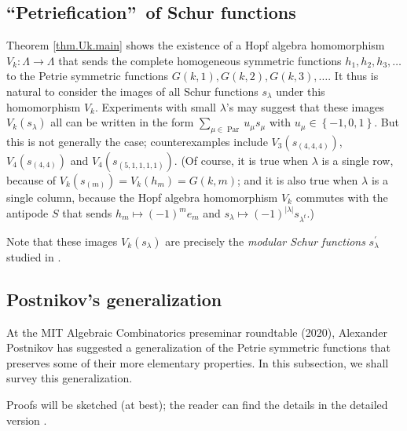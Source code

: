 \documentclass[numbers=enddot,12pt,final,onecolumn,notitlepage]{scrartcl}%
\theoremstyle{definition}
\let\sumnonlimits\sum
\renewcommand{\sum}{\sumnonlimits\limits}
\newenvironment{vershort}{}{}
\begin{document}
\subsection{\textquotedblleft Petriefication\textquotedblright\ of Schur
functions}

Theorem \ref{thm.Uk.main} shows the existence of a Hopf algebra homomorphism
$V_{k}:\Lambda\rightarrow\Lambda$ that sends the complete homogeneous
symmetric functions $h_{1},h_{2},h_{3},\ldots$ to the Petrie symmetric
functions $G\left(  k,1\right)  ,G\left(  k,2\right)  ,G\left(  k,3\right)
,\ldots$. It thus is natural to consider the images of all Schur functions
$s_{\lambda}$ under this homomorphism $V_{k}$. Experiments with small
$\lambda$'s may suggest that these images $V_{k}\left(  s_{\lambda}\right)  $
all can be written in the form $\sum_{\mu\in\operatorname*{Par}}u_{\mu}s_{\mu
}$ with $u_{\mu}\in\left\{  -1,0,1\right\}  $. But this is not generally the
case; counterexamples include $V_{3}\left(  s_{\left(  4,4,4\right)  }\right)
$, $V_{4}\left(  s_{\left(  4,4\right)  }\right)  $ and $V_{4}\left(
s_{\left(  5,1,1,1,1\right)  }\right)  $. (Of course, it is true when
$\lambda$ is a single row, because of $V_{k}\left(  s_{\left(  m\right)
}\right)  =V_{k}\left(  h_{m}\right)  =G\left(  k,m\right)  $; and it is also
true when $\lambda$ is a single column, because the Hopf algebra homomorphism
$V_{k}$ commutes with the antipode $S$ that sends $h_{m}\mapsto\left(
-1\right)  ^{m}e_{m}$ and $s_{\lambda}\mapsto\left(  -1\right)  ^{\left\vert
\lambda\right\vert }s_{\lambda^{t}}$.)

Note that these images $V_{k}\left(  s_{\lambda}\right)  $ are precisely the
\emph{modular Schur functions} $s_{\lambda}^{\prime}$ studied in
\cite{Walker94}.

\subsection{Postnikov's generalization}

At the MIT Algebraic Combinatorics preseminar roundtable (2020), Alexander
Postnikov has suggested a generalization of the Petrie symmetric functions
that preserves some of their more elementary properties. In this subsection,
we shall survey this generalization.

\begin{vershort}
Proofs will be sketched (at best); the reader can find the details in the
detailed version \cite{verlong}.
\end{vershort}
\end{document}

